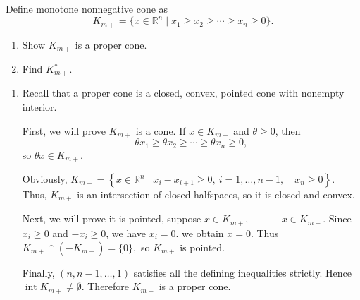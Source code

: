 \documentclass{ctexart}
\begin{document}
\begin{problem}\label{pro:2.33}
  Define monotone nonnegative cone as \[
    K_{m + } = \{x \in \mathbb{R}^n \mid x_1 \geq x_2 \geq \cdots \geq x_n \geq 0\}.
  \]
  \begin{enumerate}
    \item Show \(K_{m + } \) is a proper cone.
    \item Find \(K_{m + }^* \).
  \end{enumerate}

\end{problem}
\begin{solution}
  \begin{enumerate}
    \item
      Recall that a proper cone is a closed, convex, pointed cone with
      nonempty interior.

      First, we will prove \(K_{m+}\) is a cone. If \(x\in K_{m+}\) and
      \(\theta\geq 0\), then
      \[
        \theta x_1 \geq \theta x_2 \geq \cdots
        \geq \theta x_n \geq 0,
      \]
      so \(\theta x\in K_{m+}\).

      Obviously,
      \(
        K_{m+}
        =
        \left\{
          x \in \mathbb{R}^n
          \mid
          x_i-x_{i+1}\geq 0,\ i=1,\ldots,n-1,
          \quad x_n\geq 0
        \right\}.
      \)
      Thus, \(K_{m+}\) is an intersection of closed halfspaces, so it is
      closed and convex.

      Next, we will prove it is pointed, suppose
      \(
        x\in K_{m+},\qquad -x\in K_{m+}.
      \)
      Since \(x_i\geq0\) and \(-x_i\geq0\), we have \(x_i=0\).
      we obtain \(x=0\).
      Thus
      \(
        K_{m+}\cap(-K_{m+})=\{0\},
      \)
      so \(K_{m+}\) is pointed.

      Finally,
      \(
        (n,n-1,\ldots,1)
      \)
      satisfies all the defining inequalities strictly. Hence
      \(
        \operatorname{int}K_{m+}\neq\emptyset.
      \)
      Therefore \(K_{m+}\) is a proper cone.


\end{enumerate}
\end{solution}
\end{document}
